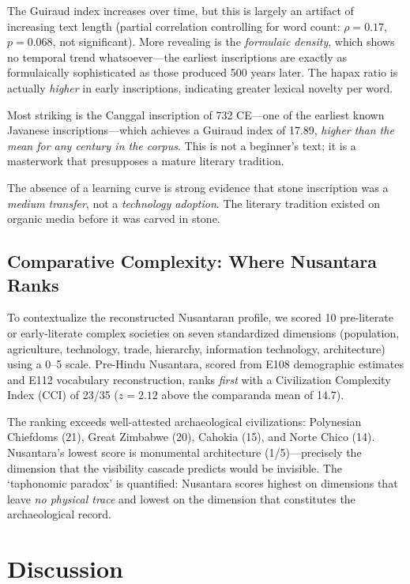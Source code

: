 \documentclass[12pt,a4paper]{article}
\begin{document}
The Guiraud index increases over time, but this is largely an artifact of increasing text length (partial correlation controlling for word count: $\rho = 0.17$, $p = 0.068$, not significant). More revealing is the \textit{formulaic density}, which shows no temporal trend whatsoever---the earliest inscriptions are exactly as formulaically sophisticated as those produced 500 years later. The hapax ratio is actually \textit{higher} in early inscriptions, indicating greater lexical novelty per word.

Most striking is the Canggal inscription of 732 CE---one of the earliest known Javanese inscriptions---which achieves a Guiraud index of 17.89, \textit{higher than the mean for any century in the corpus}. This is not a beginner's text; it is a masterwork that presupposes a mature literary tradition.

The absence of a learning curve is strong evidence that stone inscription was a \textit{medium transfer}, not a \textit{technology adoption}. The literary tradition existed on organic media before it was carved in stone.

\subsection{Comparative Complexity: Where Nusantara Ranks}

To contextualize the reconstructed Nusantaran profile, we scored 10 pre-literate or early-literate complex societies on seven standardized dimensions (population, agriculture, technology, trade, hierarchy, information technology, architecture) using a 0--5 scale. Pre-Hindu Nusantara, scored from E108 demographic estimates and E112 vocabulary reconstruction, ranks \textit{first} with a Civilization Complexity Index (CCI) of 23/35 ($z = 2.12$ above the comparanda mean of 14.7).

The ranking exceeds well-attested archaeological civilizations: Polynesian Chiefdoms (21), Great Zimbabwe (20), Cahokia (15), and Norte Chico (14). Nusantara's lowest score is monumental architecture (1/5)---precisely the dimension that the visibility cascade predicts would be invisible. The `taphonomic paradox' is quantified: Nusantara scores highest on dimensions that leave \textit{no physical trace} and lowest on the dimension that constitutes the archaeological record.

\section{Discussion}
\end{document}
